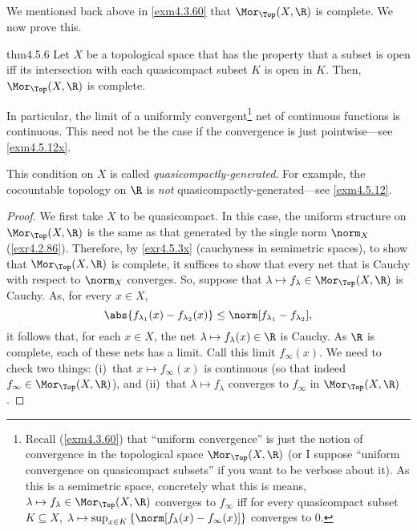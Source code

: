 We mentioned back above in \cref{exm4.3.60} that $\Mor _{\Top}(X,\R )$ is complete.  We now prove this.
\begin{thm}{}{thm4.5.6}
Let $X$ be a topological space that has the property that a subset is open iff its intersection with each quasicompact subset $K$ is open in $K$.  Then, $\Mor _{\Top}(X,\R )$ is complete.
\begin{rmk}
In particular, the limit of a uniformly convergent\footnote{Recall (\cref{exm4.3.60}) that ``uniform convergence'' is just the notion of convergence in the topological space $\Mor _{\Top}(X,\R )$ (or I suppose ``uniform convergence on quasicompact subsets'' if you want to be verbose about it).  As this is a semimetric space, concretely what this is means, $\lambda \mapsto f_{\lambda}\in \Mor _{\Top}(X,\R )$ converges to $f_{\infty}$ iff for every quasicompact subset $K\subseteq X$, $\lambda \mapsto \sup _{x\in K}\left\{ \norm[f_{\lambda}(x)-f_{\infty}(x)]\right\}$ converges to $0$.} net of continuous functions is continuous.  This need not be the case if the convergence is just pointwise---see \cref{exm4.5.12x}.
\end{rmk}
\begin{rmk}
This condition on $X$ is called \emph{quasicompactly-generated}.  For example, the cocountable topology on $\R$ is \emph{not} quasicompactly-generated---see \cref{exm4.5.12}.
\end{rmk}
\begin{proof}
We first take $X$ to be quasicompact.  In this case, the uniform structure on $\Mor _{\Top}(X,\R )$ is the same as that generated by the single norm $\norm _X$ (\cref{exr4.2.86}).  Therefore, by \cref{exr4.5.3x} (cauchyness in semimetric spaces), to show that $\Mor _{\Top}(X,\R )$ is complete, it suffices to show that every net that is Cauchy with respect to $\norm _X$ converges.  So, suppose that $\lambda \mapsto f_\lambda \in \Mor _{\Top}(X,\R )$ is Cauchy.  As, for every $x\in X$,
\begin{equation}
\abs{f_{\lambda _1}(x)-f_{\lambda _2}(x)}\leq \norm[f_{\lambda _1}-f_{\lambda _2}],
\end{equation}
it follows that, for each $x\in X$, the net $\lambda \mapsto f_\lambda (x)\in \R$ is Cauchy.  As $\R$ is complete, each of these nets has a limit.  Call this limit $f_\infty (x)$.  We need to check two things:  (i)~that $x\mapsto f_\infty (x)$ is continuous (so that indeed $f_\infty \in \Mor _{\Top}(X,\R )$), and (ii)~that $\lambda \mapsto f_\lambda$ converges to $f_\infty$ in $\Mor _{\Top}(X,\R )$.


\end{proof}
\end{thm}
